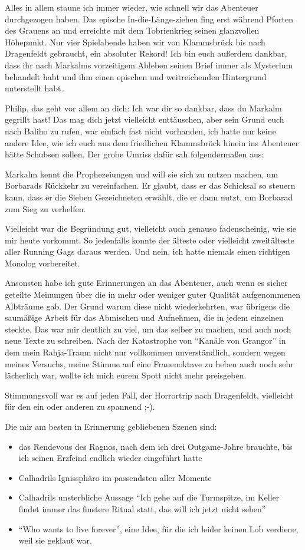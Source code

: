 Alles in allem staune ich immer wieder, wie schnell wir das Abenteuer durchgezogen haben. Das epische In-die-Länge-ziehen fing erst während Pforten des Grauens an und erreichte mit dem Tobrienkrieg seinen glanzvollen Höhepunkt. Nur vier Spielabende haben wir von Klammsbrück bis nach Dragenfeldt gebraucht, ein absoluter Rekord!
Ich bin euch außerdem dankbar, dass ihr nach Markalms vorzeitigem Ableben seinen Brief immer als Mysterium behandelt habt und ihm einen epischen und weitreichenden Hintergrund unterstellt habt.

Philip, das geht vor allem an dich: Ich war dir so dankbar, dass du Markalm gegrillt hast! Das mag dich jetzt vielleicht enttäuschen, aber sein Grund euch nach Baliho zu rufen, war einfach fast nicht vorhanden, ich hatte nur keine andere Idee, wie ich euch aus dem friedlichen Klammsbrück hinein ins Abenteuer hätte Schubsen sollen. Der grobe Umriss dafür sah folgendermaßen aus:

Markalm kennt die Prophezeiungen und will sie sich zu nutzen machen, um Borbarads Rückkehr zu vereinfachen. Er glaubt, dass er das Schicksal so steuern kann, dass er die Sieben Gezeichneten erwählt, die er dann nutzt, um Borbarad zum Sieg zu verhelfen.

Vielleicht war die Begründung gut, vielleicht auch genauso fadenscheinig, wie sie mir heute vorkommt. So jedenfalls konnte der älteste oder vielleicht zweitälteste aller Running Gags daraus werden. Und nein, ich hatte niemals einen richtigen Monolog vorbereitet.

Ansonsten habe ich gute Erinnerungen an das Abenteuer, auch wenn es sicher geteilte Meinungen über die in mehr oder weniger guter Qualität aufgenommenen Albträume gab. Der Grund warum diese nicht wiederkehrten, war übrigens die saumäßige Arbeit für das Abmischen und Aufnehmen, die in jedem einzelnen steckte. Das war mir deutlich zu viel, um das selber zu machen, und auch noch neue Texte zu schreiben. Nach der Katastrophe von ``Kanäle von Grangor'' in dem mein Rahja-Traum nicht nur vollkommen unverständlich, sondern wegen meines Versuchs, meine Stimme auf eine Frauenoktave zu heben auch noch sehr lächerlich war, wollte ich mich eurem Spott nicht mehr preisgeben.

Stimmungsvoll war es auf jeden Fall, der Horrortrip nach Dragenfeldt, vielleicht für den ein oder anderen zu spannend ;-).


Die mir am besten in Erinnerung gebliebenen Szenen sind:
\begin{itemize}
\item das Rendevous des Ragnos, nach dem ich drei Outgame-Jahre brauchte, bis ich seinen Erzfeind endlich wieder eingeführt hatte
\item Calhadrils Ignissphäro im passendsten aller Momente
\item Calhadrils unsterbliche Aussage ``Ich gehe auf die Turmspitze, im Keller findet immer das finstere Ritual statt, das will ich jetzt nicht sehen''
\item ``Who wants to live forever'', eine Idee, für die ich leider keinen Lob verdiene, weil sie geklaut war.
\end{itemize}


